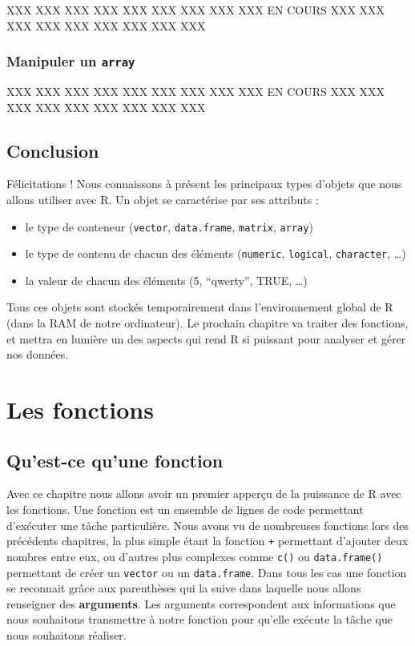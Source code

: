 \documentclass[]{book}
\providecommand{\tightlist}{%
  \setlength{\itemsep}{0pt}\setlength{\parskip}{0pt}}
\begin{document}
XXX XXX XXX XXX XXX XXX XXX XXX XXX EN COURS XXX XXX XXX XXX XXX XXX XXX
XXX XXX

\subsection{\texorpdfstring{Manipuler un
\texttt{array}}{Manipuler un array}}\label{manipuler-un-array}

XXX XXX XXX XXX XXX XXX XXX XXX XXX EN COURS XXX XXX XXX XXX XXX XXX XXX
XXX XXX

\section{Conclusion}\label{conclusion-2}

Félicitations ! Nous connaissons à présent les principaux types d'objets
que nous allons utiliser avec R. Un objet se caractérise par ses
attributs :

\begin{itemize}
\tightlist
\item
  le type de conteneur (\texttt{vector}, \texttt{data.frame},
  \texttt{matrix}, \texttt{array})
\item
  le type de contenu de chacun des éléments (\texttt{numeric},
  \texttt{logical}, \texttt{character}, \ldots{})
\item
  la valeur de chacun des éléments (5, ``qwerty'', TRUE, \ldots{})
\end{itemize}

Tous ces objets sont stockés temporairement dans l'environnement global
de R (dans la RAM de notre ordinateur). Le prochain chapitre va traiter
des fonctions, et mettra en lumière un des aspects qui rend R si
puissant pour analyser et gérer nos données.

\chapter{Les fonctions}\label{fonctions}

\section{Qu'est-ce qu'une fonction}\label{quest-ce-quune-fonction}

Avec ce chapitre nous allons avoir un premier apperçu de la puissance de
R avec les fonctions. Une fonction est un ensemble de lignes de code
permettant d'exécuter une tâche particulière. Nous avons vu de
nombreuses fonctions lors des précédents chapitres, la plus simple étant
la fonction \texttt{+} permettant d'ajouter deux nombres entre eux, ou
d'autres plus complexes comme \texttt{c()} ou \texttt{data.frame()}
permettant de créer un \texttt{vector} ou un \texttt{data.frame}. Dans
tous les cas une fonction se reconnait grâce aux parenthèses qui la
suive dans laquelle nous allons renseigner des \textbf{arguments}. Les
arguments correspondent aux informations que nous souhaitons transmettre
à notre fonction pour qu'elle exécute la tâche que nous souhaitons
réaliser.
\end{document}
